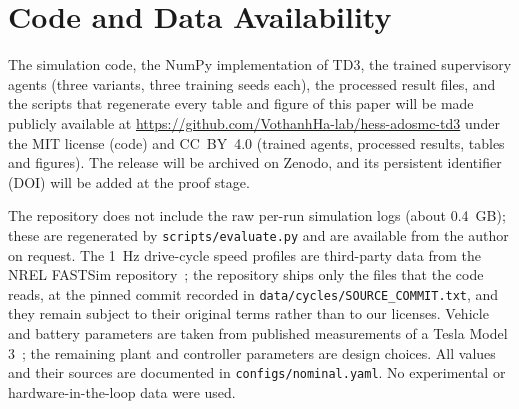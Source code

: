 \section*{Code and Data Availability}
The simulation code, the NumPy implementation of TD3, the trained supervisory agents (three variants, three training seeds each), the processed result files, and the scripts that regenerate every table and figure of this paper will be made publicly available at \url{https://github.com/VothanhHa-lab/hess-adosmc-td3} under the MIT license (code) and CC~BY~4.0 (trained agents, processed results, tables and figures). The release will be archived on Zenodo, and its persistent identifier (DOI) will be added at the proof stage.

The repository does not include the raw per-run simulation logs (about \SI{0.4}{GB}); these are regenerated by \texttt{scripts/evaluate.py} and are available from the author on request. The \SI{1}{Hz} drive-cycle speed profiles are third-party data from the NREL FASTSim repository~\cite{fastsimrepo}; the repository ships only the files that the code reads, at the pinned commit recorded in \texttt{data/cycles/SOURCE\_COMMIT.txt}, and they remain subject to their original terms rather than to our licenses. Vehicle and battery parameters are taken from published measurements of a Tesla Model 3~\cite{rosenberger2024m3}; the remaining plant and controller parameters are design choices. All values and their sources are documented in \texttt{configs/nominal.yaml}. No experimental or hardware-in-the-loop data were used.
